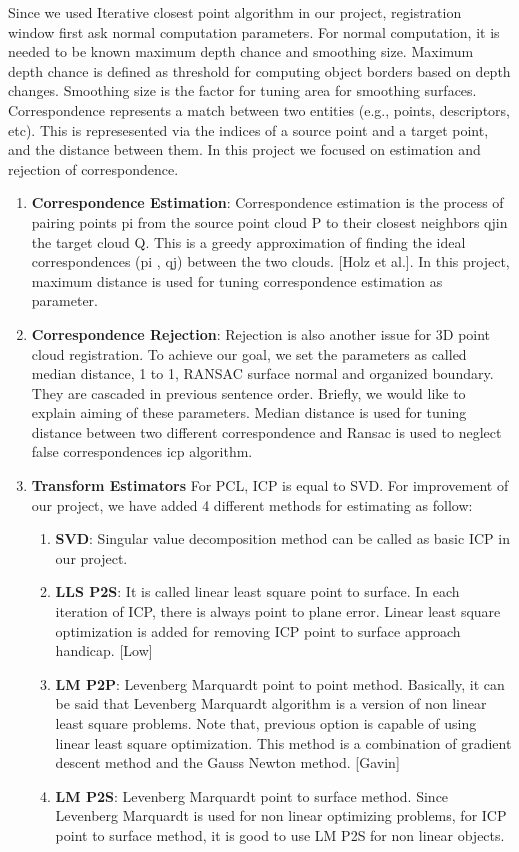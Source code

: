 \documentclass[aps,letterpaper,11pt]{revtex4}
\begin{document}
Since we used Iterative closest point algorithm in our project, registration window first ask normal computation parameters. For normal computation, it is needed to be known maximum depth chance and smoothing size. Maximum depth chance is defined as  threshold for computing object borders based on depth changes. Smoothing size is the factor for tuning area for smoothing surfaces.  Correspondence represents a match between two entities (e.g., points, descriptors, etc). This is represesented via the indices of a source point and a target point, and the distance between them. In this project we focused on estimation and rejection of correspondence.
\begin{enumerate}
\item \textbf{Correspondence Estimation}: Correspondence estimation is the process of pairing points pi from the source point cloud P to their closest neighbors qjin the target cloud Q. This is a greedy approximation of finding the ideal correspondences (pi , qj) between the two clouds. [Holz et al.]. In this project, maximum distance is used for tuning correspondence estimation as parameter.
\item \textbf{Correspondence Rejection}: Rejection is also another issue for 3D point cloud registration. To achieve our goal, we set the parameters as called median distance, 1 to 1, RANSAC surface normal and organized boundary. They are cascaded in previous sentence order. Briefly, we would like to explain aiming of these parameters. Median distance is used for tuning distance between two different correspondence and Ransac is used to neglect false correspondences icp algorithm.
\item \textbf{Transform Estimators}
For PCL, ICP is equal to SVD. For improvement of our project, we have added 4 different methods  for estimating as follow:
\begin{enumerate}
 \item \textbf{SVD}: Singular value decomposition method can be called as basic ICP in our project.
\item \textbf{LLS P2S}: It is called linear least square point to surface. In each iteration of ICP, there is always point to plane error. Linear least square optimization is added for removing ICP point to surface approach handicap. [Low]
 \item \textbf{LM P2P}:  Levenberg Marquardt point to point method. Basically, it can be said that Levenberg Marquardt algorithm is a version of non linear least square problems. Note that, previous option is capable of using linear least square optimization. This method is a combination of gradient descent method and the Gauss Newton method. [Gavin]
 \item \textbf{LM P2S}: Levenberg Marquardt point to  surface method. Since Levenberg Marquardt is used for non linear optimizing problems,  for ICP point to surface method, it is good to use LM P2S for non linear objects.

\end{enumerate}




\end{enumerate}
\end{document}
